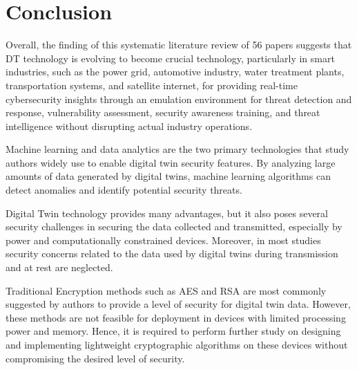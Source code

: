 \section{Conclusion}
Overall, the finding of this systematic literature review of 56 papers suggests that DT technology is evolving to become crucial technology, particularly in smart industries, such as the power grid, automotive industry, water treatment plants, transportation systems, and satellite internet, for providing real-time cybersecurity insights through an emulation environment for threat detection and response, vulnerability assessment, security awareness training, and threat intelligence without disrupting actual industry operations. 

Machine learning and data analytics are the two primary technologies that study authors widely use to enable digital twin security features. By analyzing large amounts of data generated by digital twins, machine learning algorithms can detect anomalies and identify potential security threats.

Digital Twin technology provides many advantages, but it also poses several security challenges in securing the data collected and transmitted, especially by power and computationally constrained devices. Moreover, in most studies security concerns related to the data used by digital twins during transmission and at rest are neglected.

Traditional Encryption methods such as AES and RSA are most commonly suggested by authors to provide a level of security for digital twin data. However, these methods are not feasible for deployment in devices with limited processing power and memory. Hence, it is required to perform further study on designing and implementing lightweight cryptographic algorithms on these devices without compromising the desired level of security. 



